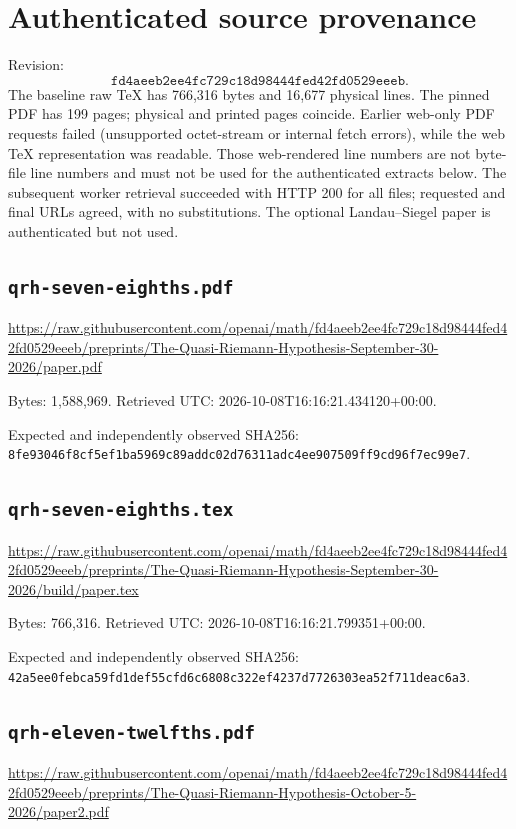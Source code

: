 \documentclass[12pt]{article}
\begin{document}
\section{Authenticated source provenance}
Revision:
\[
\texttt{fd4aeeb2ee4fc729c18d98444fed42fd0529eeeb}.
\]
The baseline raw TeX has 766,316 bytes and 16,677 physical lines.
The pinned PDF has 199 pages; physical and printed pages coincide.
Earlier web-only PDF requests failed (unsupported octet-stream or
internal fetch errors), while the web TeX representation was readable.
Those web-rendered line numbers are not byte-file line numbers and must
not be used for the authenticated extracts below.
The subsequent worker retrieval succeeded with HTTP 200 for all files;
requested and final URLs agreed, with no substitutions.
The optional Landau--Siegel paper is authenticated but not used.

\subsection*{\texttt{qrh-seven-eighths.pdf}}
\url{https://raw.githubusercontent.com/openai/math/fd4aeeb2ee4fc729c18d98444fed42fd0529eeeb/preprints/The-Quasi-Riemann-Hypothesis-September-30-2026/paper.pdf}

Bytes: 1,588,969. Retrieved UTC: 2026-10-08T16:16:21.434120+00:00.

Expected and independently observed SHA256: \nolinkurl{8fe93046f8cf5ef1ba5969c89addc02d76311adc4ee907509ff9cd96f7ec99e7}.

\subsection*{\texttt{qrh-seven-eighths.tex}}
\url{https://raw.githubusercontent.com/openai/math/fd4aeeb2ee4fc729c18d98444fed42fd0529eeeb/preprints/The-Quasi-Riemann-Hypothesis-September-30-2026/build/paper.tex}

Bytes: 766,316. Retrieved UTC: 2026-10-08T16:16:21.799351+00:00.

Expected and independently observed SHA256: \nolinkurl{42a5ee0febca59fd1def55cfd6c6808c322ef4237d7726303ea52f711deac6a3}.

\subsection*{\texttt{qrh-eleven-twelfths.pdf}}
\url{https://raw.githubusercontent.com/openai/math/fd4aeeb2ee4fc729c18d98444fed42fd0529eeeb/preprints/The-Quasi-Riemann-Hypothesis-October-5-2026/paper2.pdf}
\end{document}
